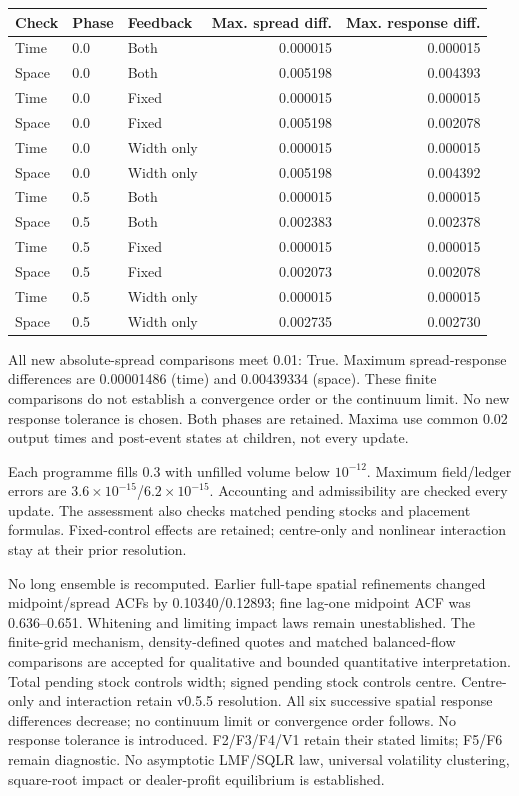 \documentclass[11pt,a4paper]{article}
\begin{document}
\begin{center}\small\begin{tabular}{lllrr}
\toprule
Check & Phase & Feedback & Max. spread diff. & Max. response diff.\\
\midrule
Time & 0.0 & Both & 0.000015 & 0.000015 \\
Space & 0.0 & Both & 0.005198 & 0.004393 \\
Time & 0.0 & Fixed & 0.000015 & 0.000015 \\
Space & 0.0 & Fixed & 0.005198 & 0.002078 \\
Time & 0.0 & Width only & 0.000015 & 0.000015 \\
Space & 0.0 & Width only & 0.005198 & 0.004392 \\
Time & 0.5 & Both & 0.000015 & 0.000015 \\
Space & 0.5 & Both & 0.002383 & 0.002378 \\
Time & 0.5 & Fixed & 0.000015 & 0.000015 \\
Space & 0.5 & Fixed & 0.002073 & 0.002078 \\
Time & 0.5 & Width only & 0.000015 & 0.000015 \\
Space & 0.5 & Width only & 0.002735 & 0.002730 \\
\bottomrule
\end{tabular}\end{center}
All new absolute-spread comparisons meet 0.01: True.
Maximum spread-response differences are 0.00001486 (time) and
0.00439334 (space).
These finite comparisons do not establish a convergence order or the continuum
limit. No new response tolerance is chosen. Both phases are retained. Maxima
use common 0.02 output times and post-event states at children, not every update.

Each programme fills 0.3 with unfilled volume below $10^{-12}$. Maximum
field/ledger errors are $3.6\times10^{-15}$/$6.2\times10^{-15}$.
Accounting and admissibility are checked every update. The assessment also
checks matched pending stocks and placement formulas. Fixed-control effects
are retained; centre-only and nonlinear interaction stay at their prior resolution.

No long ensemble is recomputed. Earlier full-tape spatial refinements changed
midpoint/spread ACFs by 0.10340/0.12893; fine lag-one midpoint ACF was
0.636--0.651. Whitening and limiting impact laws remain unestablished.
The finite-grid mechanism, density-defined quotes and matched balanced-flow
comparisons are accepted for qualitative and bounded quantitative interpretation.
Total pending stock controls width; signed pending stock controls centre.
Centre-only and interaction retain v0.5.5 resolution. All six successive spatial
response differences decrease; no continuum limit or convergence order follows.
No response tolerance is introduced. F2/F3/F4/V1 retain their stated limits;
F5/F6 remain diagnostic. No asymptotic LMF/SQLR law, universal volatility
clustering, square-root impact or dealer-profit equilibrium is established.
\end{document}
